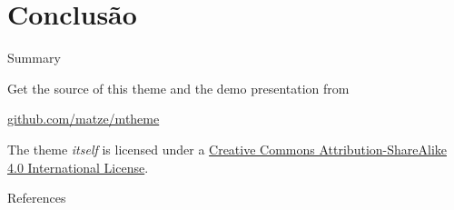\documentclass[10pt]{beamer}
\begin{document}
%
%
%
%

\section{Conclusão}

\begin{frame}{Summary}

  Get the source of this theme and the demo presentation from

  \begin{center}\url{github.com/matze/mtheme}\end{center}

  The theme \emph{itself} is licensed under a
  \href{http://creativecommons.org/licenses/by-sa/4.0/}{Creative Commons
  Attribution-ShareAlike 4.0 International License}.

  \begin{center}\ccbysa\end{center}

\end{frame}


\begin{frame}[allowframebreaks]{References}

  
  

\end{frame}
\end{document}
